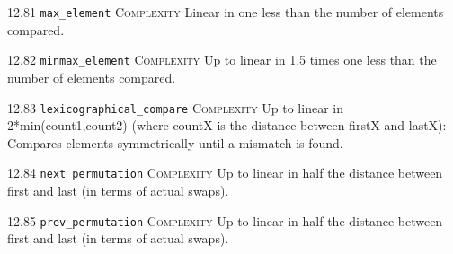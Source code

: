 \noindent\textcolor{corange}{12.81 \texttt{max\_element}} \textsc{Complexity} Linear in one less than the number of elements compared. \vspace{0.5em}

\noindent\textcolor{corange}{12.82 \texttt{minmax\_element}} \textsc{Complexity} Up to linear in 1.5 times one less than the number of elements compared. \vspace{0.5em}

\noindent\textcolor{corange}{12.83 \texttt{lexicographical\_compare}} \textsc{Complexity} Up to linear in 2*min(count1,count2) (where countX is the distance between firstX and lastX): Compares elements symmetrically until a mismatch is found. \vspace{0.5em}

\noindent\textcolor{corange}{12.84 \texttt{next\_permutation}} \textsc{Complexity} Up to linear in half the distance between first and last (in terms of actual swaps). \vspace{0.5em}

\noindent\textcolor{corange}{12.85 \texttt{prev\_permutation}} \textsc{Complexity} Up to linear in half the distance between first and last (in terms of actual swaps). \vspace{0.5em}

